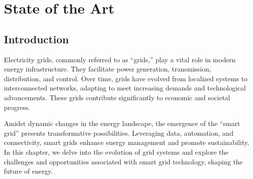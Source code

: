 \chapter{State of the Art} \label{chap:state_of_the_art}


\section*{Introduction}
Electricity grids, commonly referred to as “grids,” play a vital role in modern energy infrastructure. They facilitate power generation, transmission, distribution, and control. Over time, grids have evolved from localized systems to interconnected networks, adapting to meet increasing demands and technological advancements. These grids contribute significantly to economic and societal progress.

Amidst dynamic changes in the energy landscape, the emergence of the “smart grid” presents transformative possibilities. Leveraging data, automation, and connectivity, smart grids enhance energy management and promote sustainability. In this chapter, we delve into the evolution of grid systems and explore the challenges and opportunities associated with smart grid technology, shaping the future of energy.
\newpage


